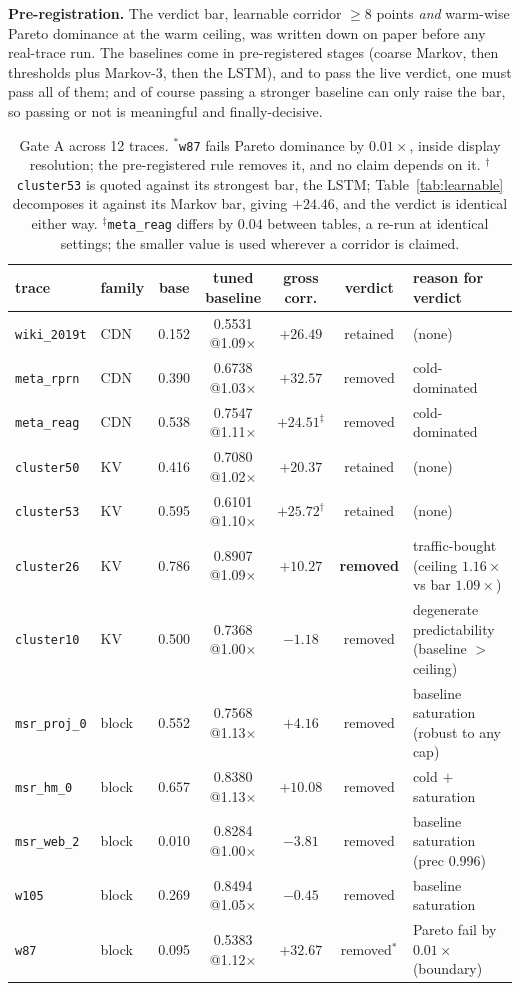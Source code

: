 \documentclass[letterpaper]{article} %
\newcommand{\x}{$\times$}
\begin{document}
\textbf{Pre-registration.} The verdict bar, learnable corridor $\ge 8$ points \emph{and} warm-wise Pareto dominance at the warm ceiling, was written down on paper before any real-trace run. The baselines come in pre-registered stages (coarse Markov, then thresholds plus Markov-3, then the LSTM), and to pass the live verdict, one must pass all of them; and of course passing a stronger baseline can only raise the bar, so passing or not is meaningful and finally-decisive.


\begin{table}[t]
\centering\small
\setlength{\tabcolsep}{4.5pt}
\begin{tabular}{llccccp{5.2cm}}
\toprule
trace & family & base & tuned baseline & gross corr. & verdict & reason for verdict \\
\midrule
\texttt{wiki\_2019t} & CDN & 0.152 & 0.5531 @1.09\x & $+26.49$ & retained & (none)  \\
\texttt{meta\_rprn} & CDN & 0.390 & 0.6738 @1.03\x & $+32.57$ & removed &  cold-dominated \\
\texttt{meta\_reag} & CDN & 0.538 & 0.7547 @1.11\x & $+24.51^{\ddagger}$ & removed &  cold-dominated \\
\texttt{cluster50} & KV & 0.416 & 0.7080 @1.02\x & $+20.37$ & retained & (none)  \\
\texttt{cluster53} & KV & 0.595 & 0.6101 @1.10\x & $+25.72^{\dagger}$ & retained & (none)  \\
\texttt{cluster26} & KV & 0.786 & 0.8907 @1.09\x & $+10.27$ & \textbf{removed} & traffic-bought (ceiling $1.16\times$ vs bar $1.09\times$) \\
\texttt{cluster10} & KV & 0.500 & 0.7368 @1.00\x & $-1.18$ & removed & degenerate predictability (baseline $>$ ceiling) \\
\texttt{msr\_proj\_0} & block & 0.552 & 0.7568 @1.13\x & $+4.16$ & removed & baseline saturation (robust to any cap) \\
\texttt{msr\_hm\_0} & block & 0.657 & 0.8380 @1.13\x & $+10.08$ & removed &  cold $+$ saturation \\
\texttt{msr\_web\_2} & block & 0.010 & 0.8284 @1.00\x & $-3.81$ & removed & baseline saturation (prec 0.996) \\
\texttt{w105} & block & 0.269 & 0.8494 @1.05\x & $-0.45$ & removed & baseline saturation \\
\texttt{w87} & block & 0.095 & 0.5383 @1.12\x & $+32.67$ & removed$^{*}$ & Pareto fail by $0.01\times$ (boundary) \\
\bottomrule
\end{tabular}
\caption{Gate A across 12 traces. $^{*}$\texttt{w87} fails Pareto dominance by $0.01\times$, inside display resolution; the pre-registered rule removes it, and no claim depends on it. $^{\dagger}$\texttt{cluster53} is quoted against its strongest bar, the LSTM; Table~\ref{tab:learnable} decomposes it against its Markov bar, giving $+24.46$, and the verdict is identical either way. $^{\ddagger}$\texttt{meta\_reag} differs by $0.04$ between tables, a re-run at identical settings; the smaller value is used wherever a corridor is claimed.}
\label{tab:gatea}
\end{table}
\end{document}
